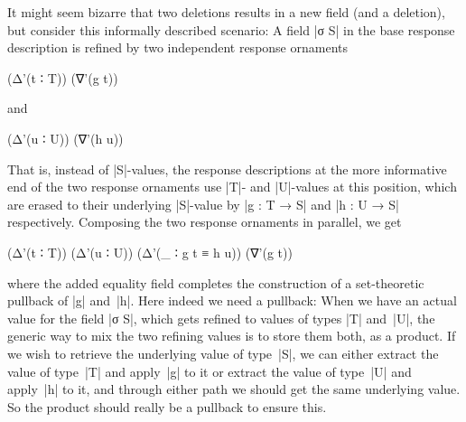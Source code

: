 \begin{itemize}
It might seem bizarre that two deletions results in a new field (and a deletion), but consider this informally described scenario:
A field |σ S| in the base response description is refined by two independent response ornaments
\savecolumns
\begin{code}
(Δ'(t ∶ T))  (∇'(g t))
\end{code}
and
\restorecolumns
\begin{code}
(Δ'(u ∶ U))  (∇'(h u))
\end{code}
That is, instead of |S|-values, the response descriptions at the more informative end of the two response ornaments use |T|- and |U|-values at this position, which are erased to their underlying |S|-value by |g : T → S| and |h : U → S| respectively.
Composing the two response ornaments in parallel, we get
\begin{code}
(Δ'(t ∶ T)) (Δ'(u ∶ U)) (Δ'(_ ∶ g t ≡ h u)) (∇'(g t))
\end{code}
where the added equality field completes the construction of a set-theoretic pullback of |g| and~|h|.
Here indeed we need a pullback:
When we have an actual value for the field |σ S|, which gets refined to values of types |T| and~|U|, the generic way to mix the two refining values is to store them both, as a product. If we wish to retrieve the underlying value of type~|S|, we can either extract the value of type~|T| and apply~|g| to it or extract the value of type~|U| and apply~|h| to it, and through either path we should get the same underlying value.
So the product should really be a pullback to ensure this.
\end{itemize}


